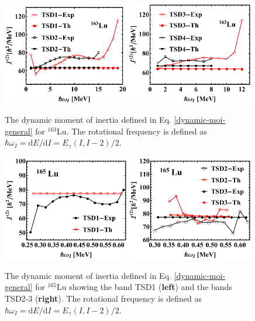 \begin{figure}
    \centering
    \includegraphics[width=0.49\textwidth]{Chapters/Figures/Lu-exp-energies/fig16a_lu163.pdf}
    \includegraphics[width=0.49\textwidth]{Chapters/Figures/Lu-exp-energies/fig16b_lu163.pdf}
    \caption{The dynamic moment of inertia defined in Eq. \ref{dynamic-moi-general} for $^{163}$Lu. The rotational frequency is defined as $\hbar\omega_I=\text{d}E/\text{d}I=E_\gamma(I,I-2)/2$.}
    \label{dynamic-moi-Lu-163}
\end{figure}
\begin{figure}
    \centering
    \includegraphics[width=0.49\textwidth]{Chapters/Figures/Lu-exp-energies/fig17a_lu165.pdf}
    \includegraphics[width=0.49\textwidth]{Chapters/Figures/Lu-exp-energies/fig17b_lu165.pdf}
    \caption{The dynamic moment of inertia defined in Eq. \ref{dynamic-moi-general} for $^{165}$Lu showing the band TSD1 (\textbf{left}) and the bands TSD2-3 (\textbf{right}). The rotational frequency is defined as $\hbar\omega_I=\text{d}E/\text{d}I=E_\gamma(I,I-2)/2$.}
    \label{dynamic-moi-Lu-165}
\end{figure}

